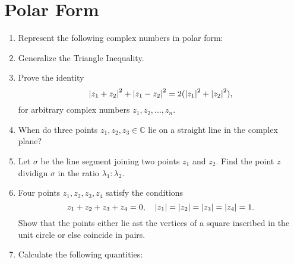 \documentclass[11pt, oneside]{book}
\begin{document}

\section{Polar Form} %
\label{sec:polar_form}

\begin{enumerate}
	\item Represent the following complex numbers in polar form:


	\item Generalize the Triangle Inequality.
	\item Prove the identity
	\begin{equation*}
		\left|z_1 + z_2\right|^2 + \left|z_1 - z_2\right|^2 = 2(\left|z_1\right|^2 + \left|z_2\right|^2),
	\end{equation*}
	for arbitrary complex numbers $z_1, z_2, ..., z_n$.

	\item When do three points $z_1, z_2, z_3 \in \mathbb{C}$ lie on a straight line in the complex plane?

	\item Let $\sigma$ be the line segment joining two points $z_1$ and $z_2$. Find the point $z$ dividign $\sigma$ in the ratio $\lambda_1 : \lambda_2$.

	\item Four points $z_1, z_2, z_3, z_4$ satisfy the conditions
	\begin{equation*}
		z_1 + z_2 + z_3 + z_4 = 0, \quad \left|z_1\right| = \left|z_2\right| = \left|z_3\right| = \left|z_4\right| = 1.
	\end{equation*}
	Show that the points either lie ast the vertices of a square inscribed in the unit circle or else coincide in pairs.

	\item Calculate the following quantities:


\end{enumerate}
\end{document}
